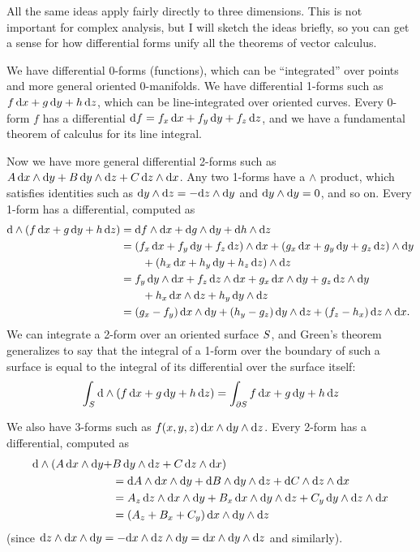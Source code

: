 \documentclass[12pt]{amsart}
\begin{document}
All the same ideas apply fairly directly to three dimensions.
This is not important for complex analysis, but I will sketch the ideas briefly, so you can get a sense for how differential forms unify all the theorems of vector calculus.

We have differential 0-forms (functions), which can be ``integrated'' over points and more general oriented 0-manifolds.
We have differential 1-forms such as $f\,\dx + g\,\dy + h\,\dz$, which can be line-integrated over oriented curves.
Every 0-form $f$ has a differential $\df = \pder f x \,\dx + \pder f y\,\dy + \pder f z\,\dz$, and we have a fundamental theorem of calculus for its line integral.

Now we have more general differential 2-forms such as $A\,\dx\wedge\dy + B\,\dy\wedge\dz + C \,\dz\wedge\dx$.
Any two 1-forms have a $\wedge$ product, which satisfies identities such as $\dy\wedge\dz = -\dz\wedge\dy$ and $\dy\wedge\dy=0$, and so on.
Every 1-form has a differential, computed as
\begin{align*}
  \ed(f\,\dx + g\,\dy + h\,\dz)
  &= \df\wedge\dx + \dg\wedge\dy + \dh\wedge\dz\\
  &= (\pder f x \,\dx + \pder f y \,\dy + \pder f z\,\dz)\wedge\dx + (\pder g x \,\dx + \pder g y \,\dy + \pder g z\,\dz)\wedge\dy\\
  &\qquad + (\pder h x \,\dx + \pder h y \,\dy + \pder h z\,\dz)\wedge\dz\\
  &= \pder f y \,\dy\wedge\dx + \pder f z\,\dz\wedge\dx + \pder g x \,\dx\wedge\dy + \pder g z\,\dz \wedge\dy \\
  &\qquad + \pder h x\,\dx\wedge\dz + \pder h y \,\dy\wedge\dz\\
  &= (\pder g x - \pder f y)\,\dx\wedge\dy + (\pder h y - \pder g z) \,\dy\wedge\dz + (\pder f z - \pder h x)\,\dz\wedge\dx.
\end{align*}
We can integrate a 2-form over an oriented surface $\surf$, and Green's theorem generalizes to say that the integral of a 1-form over the boundary of such a surface is equal to the integral of its differential over the surface itself:
\begin{equation}
  \int_{\surf} \ed(f\,\dx + g\,\dy + h\,\dz) = \int_{\bdry\surf} f\,\dx + g\,\dy + h\,\dz\label{eq:stokes-theorem}
\end{equation}

We also have 3-forms such as $f(x,y,z)\, \dx\wedge\dy\wedge\dz$.
Every 2-form has a differential, computed as
\begin{align*}
  \ed(A\,\dx\wedge\dy + & B\,\dy\wedge\dz + C \,\dz\wedge\dx)\\
  &= \dd A \wedge \dx \wedge \dy + \dd B \wedge \dy \wedge \dz + \dd C \wedge \dz \wedge \dx\\
  &= \pder A z\, \dz \wedge \dx \wedge \dy + \pder B x \,\dx \wedge \dy \wedge \dz + \pder C y \,\dy\wedge \dz \wedge \dx\\
  &= (\pder A z + \pder B x + \pder C y)\, \dx\wedge\dy\wedge \dz
\end{align*}
(since $\dz \wedge \dx \wedge \dy = -\dx \wedge \dz \wedge \dy = \dx \wedge \dy \wedge \dz$ and similarly).
\end{document}
